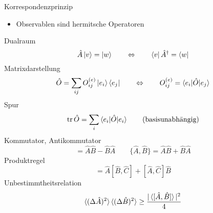 Korrespondenzprinzip \cite[Glg. 2.13]{qm}
\begin{itemize}
    \item Observablen sind hermitsche Operatoren
\end{itemize}
Dualraum \cite[Glg. A.32]{qm}
\begin{equation*}
	\hat{A}\ket{v}=\ket{w} \qquad \Leftrightarrow \qquad \bra{v}\hat{A}^\dagger=\bra{w}
\end{equation*}
Matrixdarstellung \cite[S. A.16]{qm}
\begin{equation*}
	\hat{O} = \sum_{ij}O_{ij}^{(e)}\ket{e_i}\bra{e_j} \qquad \Leftrightarrow \qquad O_{ij}^{(e)}=\braket{e_i|\hat{O}|e_j}
\end{equation*}
Spur \cite[Def. A.19, Thm. A.4]{qm}
\begin{equation*}
	\operatorname{tr}\hat{O} = \sum_i\braket{e_i|\hat{O}|e_i} \qquad \text{(basisunabhängig)}
\end{equation*}
Kommutator, Antikommutator \cite[Glg. A.22, S. 51]{qm}
\begin{equation*}
	[\hat{A},\hat{B}]=\hat{A}\hat{B}-\hat{B}\hat{A} \qquad \{\hat{A},\hat{B}\}=\hat{A}\hat{B}+\hat{B}\hat{A}
\end{equation*}
Produktregel \cite[Glg. A.23]{qm}
\begin{equation*}
	[\hat{A}\hat{B},\hat{C}] = \hat{A}[\hat{B},\hat{C}] + [\hat{A},\hat{C}]\hat{B}
\end{equation*}
Unbestimmtheitsrelation \cite[Glg. A.160]{qm}
\begin{equation*}
	\braket{(\Delta\hat{A})^2}\braket{(\Delta\hat{B})^2} \geq \frac{|\braket{[\hat{A},\hat{B}]}|^2}{4}
\end{equation*}
